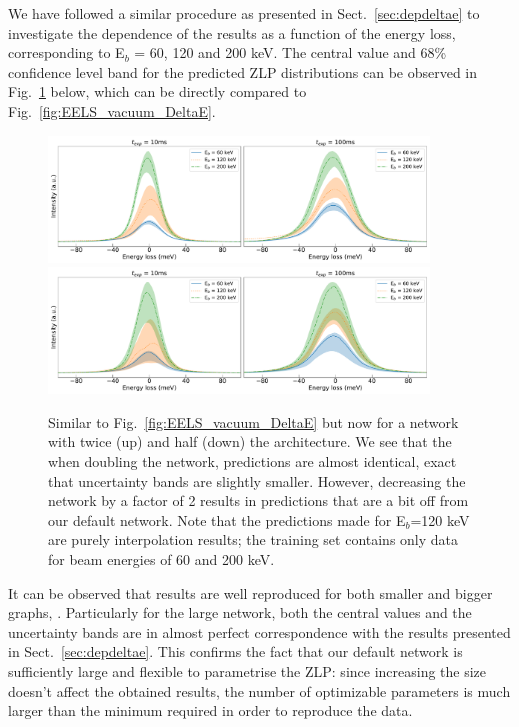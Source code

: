 We have followed a similar procedure as presented in Sect.~\ref{sec:depdeltae} to investigate
the dependence of the results as a function of the energy loss, corresponding to 
E$_b$ = 60, 120 and 200 keV. 
%
The central value and 68\% confidence level band for the predicted ZLP distributions
can be observed in Fig.~\ref{fig:EELS_vacuum_DeltaE_check} below, which can be directly
compared to Fig.~\ref{fig:EELS_vacuum_DeltaE}. 

\begin{figure}[h]
\centering
 \includegraphics[width=0.9\textwidth]{plots/Prediction_120keV_bignetwork.pdf}\label{first}
 \includegraphics[width=0.9\textwidth]{plots/Prediction_120keV_smallnetwork.pdf}\label{second}
 \caption{Similar to Fig.~\ref{fig:EELS_vacuum_DeltaE} but now
    for a network with twice (up) and half (down) the architecture. 
    We see that the when doubling the network, predictions are
    almost identical, exact that uncertainty bands are slightly smaller.
    However, decreasing the network by a factor of 2 results in predictions
    that are a bit off from our default network. 
    Note that the predictions made for E$_b$=120 keV are purely
    interpolation results; the training set contains only data for beam 
    energies of 60 and 200 keV.}
    \label{fig:EELS_vacuum_DeltaE_check}
\end{figure}
It can be observed that results are well
reproduced for both smaller and bigger graphs, . 
%
Particularly for the large network, both the central values and the uncertainty bands are 
in almost perfect correspondence with the results presented in Sect.~\ref{sec:depdeltae}. 
%
This confirms the fact that our default network is sufficiently large and flexible to parametrise
the ZLP: since increasing the size doesn't affect the obtained results, 
the number of optimizable parameters is much larger than the 
minimum required in order to reproduce the data.

